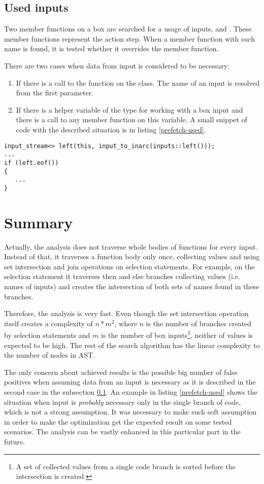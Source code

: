 \subsection{Used inputs}
\label{prefetch-used-inputs}
Two member functions on a box are searched for a usage of inputs,  and . These member functions represent the action step. When a member function with such name is found, it is tested whether it overrides the  member function.

There are two cases when data from input is considered to be necessary:

\begin{enumerate}
\item If there is a call to the  function on the  class. The name of an input is resolved from the first parameter.
\item If there is a helper variable of the type  for working with a box input and there is a call to any member function on this variable. A small snippet of code with the described situation is in listing \ref{prefetch-used}.
\end{enumerate}

\begin{lstlisting}[caption={An example of a \textit{used} input.}, label={prefetch-used}]
input_stream<> left(this, input_to_inarc(inputs::left()));
...
if (left.eof())
{
   ...
}
\end{lstlisting}

\section{Summary}
Actually, the analysis does not traverse whole bodies of functions for every input. Instead of that, it traverses a function body only once, collecting values and using set intersection and join operations on selection statements. For example, on the  selection statement it traverses then and else branches collecting values (i.e. names of inputs) and creates the intersection of both sets of names found in these branches.

Therefore, the analysis is very fast. Even though the set intersection operation itself creates a complexity of $n*m^2$, where $n$ is the number of branches created by selection statements and $m$ is the number of box inputs\footnote{A set of collected values from a single code branch is sorted before the intersection is created.}, neither of values is expected to be high. The rest of the search algorithm has the linear complexity to the number of nodes in AST.

The only concern about achieved results is the possible big number of false positives when assuming data from an input is necessary as it is described in the second case in the subsection \ref{prefetch-used-inputs}. An example in listing \ref{prefetch-used} shows the situation when input is \emph{probably} necessary only in the single branch of code, which is not a strong assumption. It was necessary to make such soft assumption in order to make the optimization get the expected result on some tested scenarios. The analysis can be vastly enhanced in this particular part in the future.